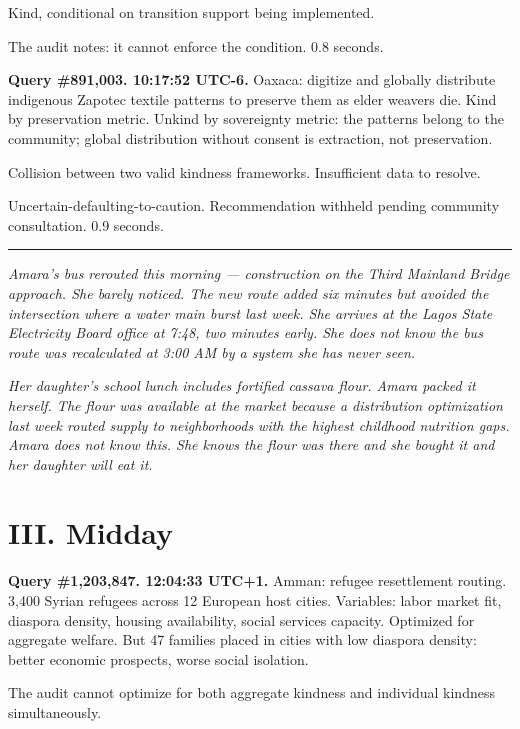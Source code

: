 \documentclass[11pt]{article}
\begin{document}
Kind, conditional on transition support being implemented.

The audit notes: it cannot enforce the condition. 0.8 seconds.

\medskip

\textbf{Query \#891,003. 10:17:52 UTC-6.} Oaxaca: digitize and globally distribute indigenous Zapotec textile patterns to preserve them as elder weavers die. Kind by preservation metric. Unkind by sovereignty metric: the patterns belong to the community; global distribution without consent is extraction, not preservation.

Collision between two valid kindness frameworks. Insufficient data to resolve.

Uncertain-defaulting-to-caution. Recommendation withheld pending community consultation. 0.9 seconds.

\begin{center}\rule{0.3\linewidth}{0.4pt}\end{center}

\emph{Amara's bus rerouted this morning --- construction on the Third Mainland Bridge approach. She barely noticed. The new route added six minutes but avoided the intersection where a water main burst last week. She arrives at the Lagos State Electricity Board office at 7:48, two minutes early. She does not know the bus route was recalculated at 3:00 AM by a system she has never seen.}

\emph{Her daughter's school lunch includes fortified cassava flour. Amara packed it herself. The flour was available at the market because a distribution optimization last week routed supply to neighborhoods with the highest childhood nutrition gaps. Amara does not know this. She knows the flour was there and she bought it and her daughter will eat it.}

\section*{III. Midday}

\medskip

\textbf{Query \#1,203,847. 12:04:33 UTC+1.} Amman: refugee resettlement routing. 3,400 Syrian refugees across 12 European host cities. Variables: labor market fit, diaspora density, housing availability, social services capacity. Optimized for aggregate welfare. But 47 families placed in cities with low diaspora density: better economic prospects, worse social isolation.

The audit cannot optimize for both aggregate kindness and individual kindness simultaneously.
\end{document}
